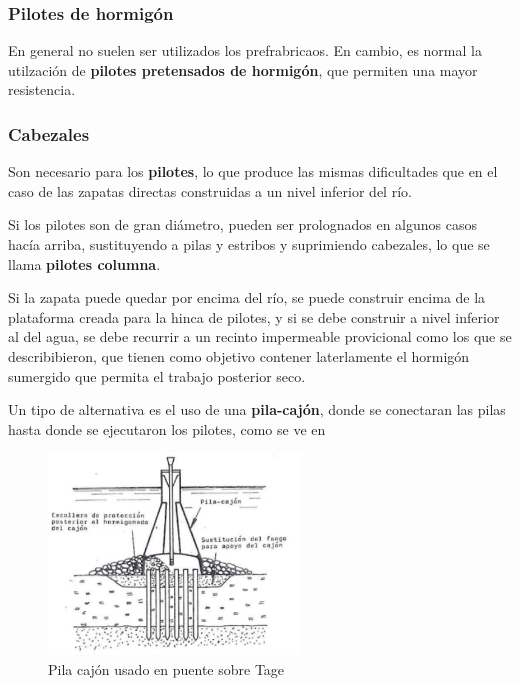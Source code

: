 \documentclass[../main.tex]{subfiles}
\begin{document}
\subsubsection{Pilotes de hormigón}

En general no suelen ser utilizados los prefrabricaos. En cambio, es normal la 
utilzación de \textbf{pilotes pretensados de hormigón}, que permiten una mayor
resistencia. 

\subsubsection{Cabezales}

Son necesario para los \textbf{pilotes}, lo que produce las mismas dificultades
que en el caso de las zapatas directas construidas a un nivel inferior del río.

Si los pilotes son de gran diámetro, pueden ser prolognados en algunos casos hacía
arriba, sustituyendo a pilas y estribos y suprimiendo cabezales, lo que se llama
\textbf{pilotes columna}.

Si la zapata puede quedar por encima del río, se puede construir encima de la 
plataforma creada para la hinca de pilotes, y si se debe construir a nivel inferior
al del agua, se debe recurrir a un recinto impermeable provicional como los que
se describibieron, que tienen como objetivo contener laterlamente el hormigón
sumergido que permita el trabajo posterior seco.

Un tipo de alternativa es el uso de una \textbf{pila-cajón}, donde se conectaran
las pilas hasta donde se ejecutaron los pilotes, como se ve en 

\begin{figure}[ht]
  \centering
  \includegraphics[width=0.6\textwidth]{../images/20210419/pila-cajon}
  \caption{Pila cajón usado en puente sobre Tage}
  \label{fig:pila-cajon}
\end{figure}
\end{document}

